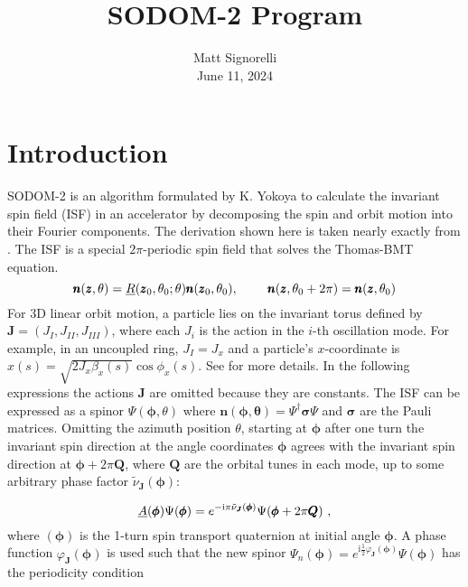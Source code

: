 \documentclass{hitec}     %
\title{SODOM-2 Program}
\author{}
\date{Matt Signorelli\\ June 11, 2024}
\newcommand{\Section}[1]{\section{#1}\vspace*{-1ex}}
\begin{document}
{}
\maketitle
{}
{}
\tableofcontents


\Section{Introduction}
\label{s:intro}
SODOM-2 is an algorithm formulated by K. Yokoya \cite{b:yokoya} to calculate the invariant spin field (ISF) in an accelerator by decomposing the spin and orbit motion into their Fourier components. The derivation shown here is taken nearly exactly from \cite{b:spin.hoff}. The ISF is a special $2\pi$-periodic spin field that solves the Thomas-BMT equation.
\begin{equation}
    \pmb{n}(\pmb{z},\theta)=\textrm{\underbar{$R$}}(\pmb{z}_0,\theta_0 ; \theta)\pmb{n}(\pmb{z}_0, \theta_0),\ \ \ \ \ \ \ \pmb{n}(\pmb{z},\theta_0+2\pi) = \pmb{n}(\pmb{z},\theta_0)
\end{equation}
For 3D linear orbit motion, a particle lies on the invariant torus defined by $\pmb{J} = (J_I, J_{II}, J_{III})$, where each $J_i$ is the action in the $i$-th oscillation mode. For example, in an uncoupled ring, $J_I = J_x$ and a particle's $x$-coordinate is $x(s)=\sqrt{2J_x\beta_x(s)}\cos{\phi_{x}(s)}$. See \cite{b:wolski} for more details. In the following expressions the actions $\pmb{J}$ are omitted because they are constants. The ISF can be expressed as a spinor $\Psi(\pmb{\phi},\theta)$ where $\pmb{n}(\pmb{\phi,\theta}) = \Psi^\dagger\pmb{\sigma}\Psi$ and $\pmb{\sigma}$ are the Pauli matrices. Omitting the azimuth position $\theta$, starting at $\pmb{\phi}$ after one turn the invariant spin direction at the angle coordinates $\pmb{\phi}$ agrees with the invariant spin direction at $\pmb{\phi}+2\pi\pmb{Q}$, where $\pmb{Q}$ are the orbital tunes in each mode, up to some arbitrary phase factor $\tilde{\nu}_{\pmb{J}}(\pmb{\phi})$:

\begin{equation}
   \textrm{\underbar{$A$}}(\pmb{\phi})\Psi(\pmb{\phi}) =e^{-\textrm{i}\pi\tilde{\nu}_{\pmb{J}}(\pmb{\phi})}\Psi(\pmb{\phi}+2\pi\pmb{Q})  \ , 
\end{equation}
where \textrm{}$(\pmb{\phi})$ is the 1-turn spin transport quaternion at initial angle $\pmb{\phi}$. A phase function $\varphi_{\pmb{J}}(\pmb{\phi})$ is used such that the new spinor $\Psi_n(\pmb{\phi})=e^{\textrm{i}\frac{1}{2}\varphi_{\pmb{J}}(\pmb{\phi})}\Psi(\pmb{\phi})$ has the periodicity condition
\end{document}
